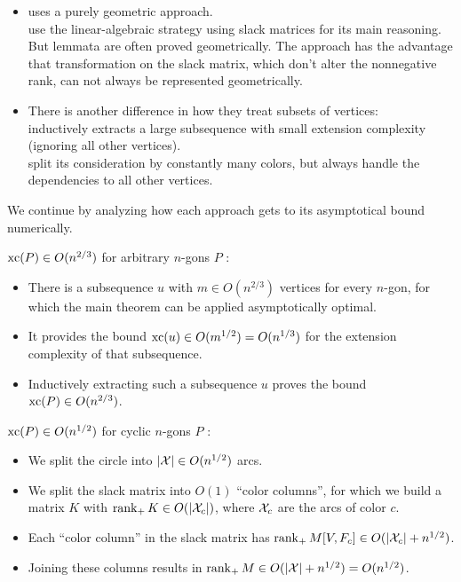 \begin{itemize}
  \item \textcite{shitov2020sublinear} uses a purely geometric approach.\\
        \textcite{kwan2020extension} use the linear-algebraic strategy using slack matrices for its main reasoning. But lemmata are often proved geometrically. The approach has the advantage that transformation on the slack matrix, which don't alter the nonnegative rank, can not always be represented geometrically.
  \item There is another difference in how they treat subsets of vertices:\\
        \textcite{shitov2020sublinear} inductively extracts a large subsequence with small extension complexity (ignoring all other vertices).\\
        \textcite{kwan2020extension} split its consideration by constantly many colors, but always handle the dependencies to all other vertices.
\end{itemize}

We continue by analyzing how each approach gets to its asymptotical bound numerically.

$\operatorname{xc}(P) \in O(n^{2/3})$ for arbitrary $n$-gons $P$ \cite{shitov2020sublinear}:
\begin{itemize}
  \item There is a subsequence $u$ with $m \in O(n^{2/3})$ vertices for every $n$-gon, for which the main theorem can be applied asymptotically optimal.
  \item It provides the bound $\operatorname{xc}(u) \in O(m^{1/2}) = O(n^{1/3})$ for the extension complexity of that subsequence.
  \item Inductively extracting such a subsequence $u$ proves the bound $\operatorname{xc}(P) \in O(n^{2/3})$.
\end{itemize}

$\operatorname{xc}(P) \in O(n^{1/2})$ for cyclic $n$-gons $P$ \cite{kwan2020extension}:
\begin{itemize}
  \item We split the circle into $\lvert\mathcal{X}\rvert \in O(n^{1/2})$ arcs.
  \item We split the slack matrix into $O(1)$ ``color columns'', for which we build a matrix $K$ with $\operatorname{rank}_+ K \in O(\lvert\mathcal{X}_c\rvert)$, where $\mathcal{X}_c$ are the arcs of color $c$.
  \item Each ``color column'' in the slack matrix has $\operatorname{rank}_+ M[V,F_c] \in O(\lvert\mathcal{X}_c\rvert + n^{1/2})$.
  \item Joining these columns results in $\operatorname{rank}_+ M \in O(\lvert\mathcal{X}\rvert + n^{1/2}) = O(n^{1/2})$.
\end{itemize}

